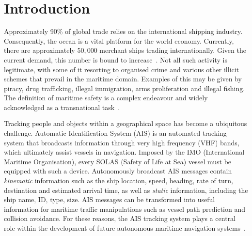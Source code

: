 \chapter{Introduction}
\label{chapter:introduction}

Approximately 90\% of global trade relies on the international shipping industry. Consequently, the ocean is a vital platform for the world economy.
Currently, there are approximately $50,000$ merchant ships trading internationally. Given the current demand, this number is bound to increase~\cite{ICS}. Not all such activity is legitimate, with some of it resorting to organised crime and various other illicit schemes that prevail in the maritime domain. Examples of this may be given by piracy, drug trafficking, illegal immigration, arms proliferation and illegal fishing. The definition of maritime safety is a complex endeavour and widely acknowledged as a transnational task~\cite{Bueger2015}.

Tracking people and objects within a geographical space has become a ubiquitous challenge. Automatic Identification System (AIS)\label{label_AIS} is an automated tracking system that broadcasts information through very high frequency (VHF) bands, which ultimately assist vessels in navigation. Imposed by the IMO (International Maritime Organisation),\label{label_IMO} every SOLAS
(Safety of Life at Sea) \label{label_SOLAS} vessel must be equipped with such a device.
Autonomously broadcast AIS messages contain \emph{kinematic} information such as the ship location, speed, heading, rate of turn, destination and estimated arrival time, as well as \emph{static} information, including the ship name, ID, type, size. AIS messages can be transformed into useful information for maritime traffic manipulations such as vessel path prediction and collision avoidance. For these reasons, the AIS tracking system plays a central role within the development of future autonomous maritime navigation systems~\cite{Mao2016}.


